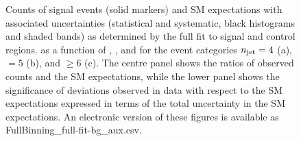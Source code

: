 \begin{figure}
\begin{center}
  \caption{Counts of signal events (solid markers) and SM expectations
    with associated uncertainties (statistical and systematic, black
    histograms and shaded bands) 
    as determined by the full fit to signal and control regions.
    as a function of \nb, \scalht, and \mht for the event categories
    $n_{\text{jet}} = 4$ (a), $=5$ (b), and ${\geq}6$ (c).
    The centre panel shows the ratios of
    observed counts and the SM expectations, while the lower panel
    shows the significance of deviations observed in data with respect
    to the SM expectations expressed in terms of the total uncertainty
    in the SM expectations.
    An electronic version of these figures is available as FullBinning\_full-fit-bg\_aux.csv.
    }
        \label{fig:T1qqqqLL_full-fit_456}
    \end{center}
\end{figure}

